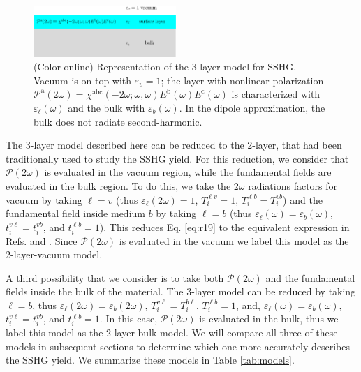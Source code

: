 \documentclass[prb,superscriptaddress,showpacs,twocolumn,letterpaper]{revtex4}
\begin{document}
\begin{figure}[t]
\centering 
\includegraphics[width=0.48\textwidth]{plots/fig1}
\caption{(Color online) Representation of the 3-layer model for SSHG. Vacuum is
on top with $\varepsilon_{v}=1$; the layer with nonlinear polarization
$\mathcal{P}^{\mathrm{a}}(2\omega) =
\chi^{\mathrm{abc}}(-2\omega;\omega,\omega)
E^{\mathrm{b}}(\omega)E^{\mathrm{c}}(\omega)$ is characterized with
$\varepsilon_{\ell}(\omega)$ and the bulk with $\varepsilon_{b}(\omega)$. In the
dipole approximation, the bulk does not radiate
second-harmonic.\label{fig:3layer}}
\end{figure}

The 3-layer model described here can be reduced to the
2-layer,\cite{mizrahiJOSA88, sipePRB87,bloembergenPR62} that had been
traditionally used to study the SSHG yield. For this reduction, we consider that
$\boldsymbol{\mathcal{P}}(2\omega)$ is evaluated in the vacuum region, while the
fundamental fields are evaluated in the bulk region. To do this, we take the
$2\omega$ radiations factors for vacuum by taking $\ell=v$ (thus
$\varepsilon_{\ell}(2\omega)=1$, $T^{\ell v}_{i}=1$, $T^{\ell
b}_{i}=T^{vb}_{i}$) and the fundamental field inside medium $b$ by taking
$\ell=b$ (thus $\varepsilon_{\ell}(\omega)=\varepsilon_{b}(\omega)$,
$t^{v\ell}_{i}=t^{vb}_{i}$, and $t^{\ell b}_{i}=1$). This reduces Eq.
\eqref{eq:r19} to the equivalent expression in Refs. 
and . Since $\boldsymbol{\mathcal{P}}(2\omega)$ is
evaluated in the vacuum we label this model as the 2-layer-vacuum model.


A third possibility that we consider is to take both
$\boldsymbol{\mathcal{P}}(2\omega)$ and the fundamental fields inside the bulk
of the material. The 3-layer model can be reduced by taking $\ell=b$, thus
$\varepsilon_{\ell}(2\omega)=\varepsilon_{b}(2\omega)$,
$T^{v\ell}_{i}=T^{b\ell}_{i}$, $T^{\ell b}_{i}=1$, and,
$\varepsilon_{\ell}(\omega)=\varepsilon_{b}(\omega)$,
$t^{v\ell}_{i}=t^{vb}_{i}$, and $t^{\ell b}_{i}=1$. In this case,
$\boldsymbol{\mathcal{P}}(2\omega)$ is evaluated in the bulk, thus we label this
model as the 2-layer-bulk model. We will compare all three of these models in
subsequent sections to determine which one more accurately describes the SSHG
yield. We summarize these models in Table
\ref{tab:models}.
\end{document}
